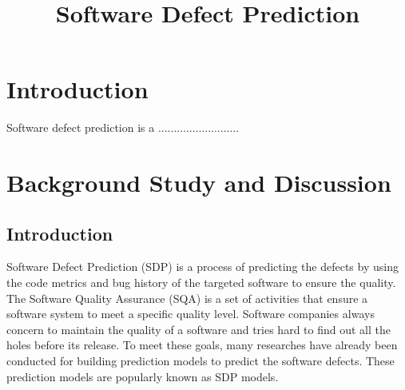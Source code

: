 \documentclass[12pt]{report}
\begin{document}
\doublespacing
\title{ Software Defect Prediction}
\date{}
\maketitle
%
%
%
%
%
%
%
\chapter{Introduction}
Software defect prediction is a ..........................
\chapter{Background Study and Discussion}
\section{Introduction}

Software Defect Prediction (SDP) is a process of predicting the defects by using the code metrics and bug history of the targeted software to ensure the quality. The Software Quality Assurance (SQA) is a set of activities that ensure a software system to meet a specific quality level. Software companies always concern to maintain the quality of a software and tries hard to find out all the holes before its release. To meet these goals, many researches have already been conducted for building prediction models to predict the software defects. These prediction models are popularly known as SDP models.
\end{document}
